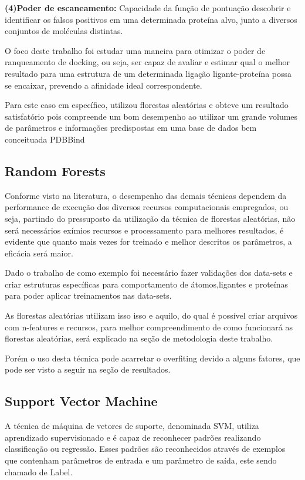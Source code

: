 \documentclass[tcc, capa]{texucpel}
\begin{document}
\textbf{(4)Poder de escaneamento:} Capacidade da função de pontuação descobrir e identificar os falsos positivos em uma determinada proteína alvo, junto a diversos conjuntos de moléculas distintas.

O foco deste trabalho foi estudar uma maneira para otimizar o poder de ranqueamento de docking, ou seja, ser capaz de avaliar e estimar qual o melhor resultado para uma estrutura de um determinada ligação ligante-proteína possa se encaixar, prevendo a afinidade ideal correspondente.

Para este caso em específico,\textbf{\cite{ballester2010machine}} utilizou florestas aleatórias e obteve um resultado satisfatório pois compreende um bom desempenho ao utilizar um grande volumes de parâmetros e informações predispostas em uma base de dados bem conceituada PDBBind \cite{wang2004pdbbind}

\subsection{Random Forests}
Conforme visto na literatura, o desempenho das demais técnicas dependem da performance de execução dos diversos recursos computacionais empregados, ou seja, partindo do pressuposto da utilização da técnica de florestas aleatórias, não será necessários exímios recursos e processamento para melhores resultados, é evidente que quanto mais vezes for treinado e melhor descritos os parâmetros, a eficácia será maior.

Dado o trabalho de \cite{ballester2010machine} como exemplo foi necessário fazer validações dos data-sets e criar estruturas específicas para comportamento de átomos,ligantes e proteínas para poder aplicar treinamentos nas data-sets.

As florestas aleatórias utilizam isso isso e aquilo, do qual é possível criar arquivos com n-features e recursos, para melhor compreendimento de como funcionará as florestas aleatórias, será explicado na seção de metodologia deste trabalho. 

Porém o uso desta técnica pode acarretar o overfiting devido a alguns fatores, que pode ser visto a seguir na seção de resultados.

\subsection{Support Vector Machine}

A técnica de máquina de vetores de suporte, denominada SVM, utiliza aprendizado supervisionado e é capaz de reconhecer padrões realizando classificação ou regressão. Esses padrões são reconhecidos através de exemplos que contenham parâmetros de entrada e um parâmetro de saída, este sendo chamado de Label.
\end{document}
